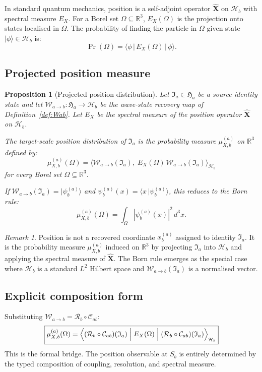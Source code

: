 \documentclass[12pt, a4paper]{article}
\theoremstyle{definition}
\theoremstyle{plain}
\newtheorem{prop}{Proposition}[section]
\theoremstyle{remark}
\newtheorem{remark}{Remark}[section]
\newcommand{\Ia}{\mathfrak{I}_a}
\newcommand{\Ha}{\mathfrak{H}_a}        %
\newcommand{\Hb}{\mathcal{H}_b}         %
\newcommand{\Sb}{S_b}
\newcommand{\Wab}{\mathcal{W}_{a\to b}}   %
\newcommand{\Cab}{\mathcal{C}_{ab}}        %
\newcommand{\Rb}{\mathcal{R}_b}            %
\newcommand{\psiab}{|\psi_b^{(a)}\rangle}
\newcommand{\psix}{\psi_b^{(a)}(x)}
\newcommand{\Xhat}{\hat{\mathbf{X}}}
\newcommand{\EX}{E_X}
\newcommand{\muX}{\mu_{X,b}^{(a)}}
\begin{document}
In standard quantum mechanics, position is a self-adjoint operator
$\Xhat$ on $\Hb$ with spectral measure $\EX$.
For a Borel set $\Omega \subseteq \mathbb{R}^3$, $\EX(\Omega)$ is
the projection onto states localised in $\Omega$.
The probability of finding the particle in $\Omega$ given state
$|\phi\rangle \in \Hb$ is:
\[
  \Pr(\Omega) = \langle \phi \,|\, \EX(\Omega) \,|\, \phi\rangle.
\]

\subsection{Projected position measure}

\begin{prop}[Projected position distribution]
\label{prop:positionmeasure}
Let $\Ia \in \Ha$ be a source identity state and let
$\Wab : \Ha \to \Hb$ be the wave-state recovery map of
Definition~\ref{def:Wab}.
Let $\EX$ be the spectral measure of the position operator
$\Xhat$ on $\Hb$.

The \emph{target-scale position distribution} of $\Ia$ is the
probability measure $\muX$ on $\mathbb{R}^3$ defined by:
\[
  \boxed{
    \muX(\Omega)
    = \bigl\langle \Wab(\Ia),\;
      \EX(\Omega)\,\Wab(\Ia)
      \bigr\rangle_{\Hb}
  }
\]
for every Borel set $\Omega \subseteq \mathbb{R}^3$.

If $\Wab(\Ia) = \psiab$ and $\psix = \langle x\,|\psi_b^{(a)}\rangle$,
this reduces to the Born rule:
\[
  \boxed{
    \muX(\Omega) = \int_{\Omega} |\psix|^2\,d^3x.
  }
\]
\end{prop}

\begin{remark}
Position is not a recovered coordinate $x_b^{(a)}$ assigned to
identity $\Ia$.
It is the probability measure $\muX$ induced on $\mathbb{R}^3$
by projecting $\Ia$ into $\Hb$ and applying the spectral measure
of $\Xhat$.
The Born rule emerges as the special case where $\Hb$ is a standard
$L^2$ Hilbert space and $\Wab(\Ia)$ is a normalised vector.
\end{remark}

\subsection{Explicit composition form}

Substituting $\Wab = \Rb \circ \Cab$:
\[
  \boxed{
    \muX(\Omega)
    = \Bigl\langle
        (\Rb\circ\Cab)(\Ia)
        \;\Big|\;
        \EX(\Omega)
        \;\Big|\;
        (\Rb\circ\Cab)(\Ia)
      \Bigr\rangle_{\Hb}
  }
\]
This is the formal bridge.
The position observable at $\Sb$ is entirely determined by the
typed composition of coupling, resolution, and spectral measure.
\end{document}
